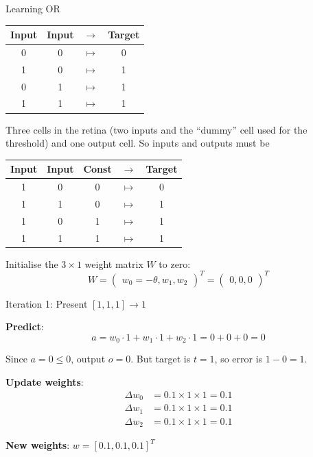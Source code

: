 \documentclass[aspectratio=169]{beamer}\usepackage[]{graphicx}\usepackage[]{xcolor}
\begin{document}
\begin{frame}{Learning OR}
    \begin{center}
        \begin{tabular}{cccc}
        Input & Input & $\to$ & Target \\
        \midrule
            0 & 0 & $\mapsto$ & 0 \\
            1 & 0 & $\mapsto$ & 1 \\
            0 & 1 & $\mapsto$ & 1 \\
            1 & 1 & $\mapsto$ & 1 \\
        \end{tabular}
    \end{center}
    Three cells in the retina (two inputs and the ``dummy'' cell used for the threshold) and one output cell. So inputs and outputs must be
    \begin{center}
        \begin{tabular}{ccccc}
        Input & Input & Const & $\to$ & Target \\
        \midrule
            1 & 0 & 0 & $\mapsto$ & 0 \\
            1 & 1 & 0 & $\mapsto$ & 1 \\
            1 & 0 & 1 & $\mapsto$ & 1 \\
            1 & 1 & 1 & $\mapsto$ & 1 \\
        \end{tabular}
    \end{center}
    Initialise the $3\times 1$ weight matrix $W$ to zero:
    \[
        W=\begin{pmatrix}
            w_0 = -\theta, w_1, w_2
        \end{pmatrix}^T
        = \begin{pmatrix}
            0, 0, 0
        \end{pmatrix}^T
    \]
\end{frame}


\begin{frame}{Iteration 1: Present $[1, 1, 1] \to 1$}

\textbf{Predict}:
\[
a = w_0 \cdot 1 + w_1 \cdot 1 + w_2 \cdot 1 = 0 + 0 + 0 = 0
\]

Since $a = 0 \leq 0$, output $o = 0$. But target is $t = 1$, so error is $1 - 0 = 1$.

\vfill
\textbf{Update weights}:
\begin{align*}
\Delta w_0 &= 0.1 \times 1 \times 1 = 0.1 \\
\Delta w_1 &= 0.1 \times 1 \times 1 = 0.1 \\
\Delta w_2 &= 0.1 \times 1 \times 1 = 0.1
\end{align*}

\vfill
\textbf{New weights}: $w = [0.1, 0.1, 0.1]^T$
\end{frame}
\end{document}
